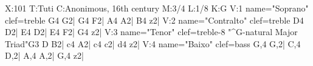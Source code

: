 X:101
T:Tuti
C:Anonimous, 16th century
M:3/4
L:1/8
K:G
V:1 name="Soprano" clef=treble
G4 G2| G4 F2| A4 A2| B4 z2|
V:2 name="Contralto" clef=treble
D4 D2| E4 D2| E4 F2| G4 z2|
V:3 name="Tenor" clef=treble-8
"^G-natural Major Triad"G3 D B2| c4 A2| c4 c2| d4 z2|
V:4 name="Baixo" clef=bass
G,4 G,2| C,4 D,2| A,4 A,2| G,4 z2|
